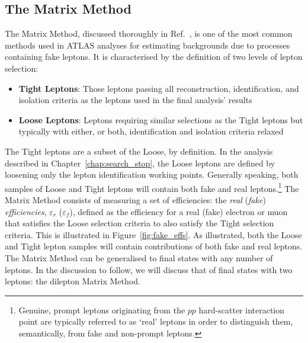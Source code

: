 \FloatBarrier
%
%
\subsection{The Matrix Method}
\label{sec:matrix_method}

The Matrix Method, discussed thoroughly in Ref.~\cite{TOPFake}, is one of the most common
methods used in ATLAS analyses for estimating backgrounds due to processes containing
fake leptons.
It is characterised by the definition of two levels of lepton selection:
\begin{itemize}
    \item[]\textbf{Tight Leptons}: Those leptons passing all reconstruction, identification, and isolation criteria
        as the leptons used in the final analysis' results
    \item[]\textbf{Loose Leptons}: Leptons requiring similar selections as the Tight leptons but typically with either, or both, identification
        and isolation criteria relaxed
\end{itemize}
The Tight leptons are a subset of the Loose, by definition.
In the analysis described in Chapter~\ref{chap:search_stop}, the Loose leptons are defined by loosening
only the lepton identification working points.
Generally speaking, both samples of Loose and Tight leptons will contain
both fake and real leptons.\footnote{Genuine, prompt
leptons originating from the $pp$ hard-scatter interaction point are typically referred to as `real' leptons
in order to distinguish them, semantically, from fake and non-prompt leptons.
}
The Matrix Method consists of measuring a set of efficiencies: the \textit{real}
(\textit{fake}) \textit{efficiencies}, $\varepsilon_r$ ($\varepsilon_f$),
defined as the efficiency for a real (fake) electron or muon that satisfies the Loose selection criteria
to also satisfy the Tight selection criteria.
This is illustrated in Figure~\ref{fig:fake_effs}.
As illustrated, both the Loose and Tight lepton samples will contain contributions of both fake
and real leptons.
The Matrix Method can be generalised to final states with any number of leptons.
In the discussion to follow, we will discuss that of final states with two leptons: the dilepton Matrix Method.

